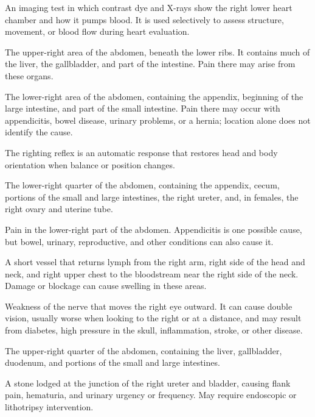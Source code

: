  An imaging test in which contrast dye and X-rays show the right lower heart chamber and how it pumps blood. It is used selectively to assess structure, movement, or blood flow during heart evaluation.

 The upper-right area of the abdomen, beneath the lower ribs. It contains much of the liver, the gallbladder, and part of the intestine. Pain there may arise from these organs.

 The lower-right area of the abdomen, containing the appendix, beginning of the large intestine, and part of the small intestine. Pain there may occur with appendicitis, bowel disease, urinary problems, or a hernia; location alone does not identify the cause.

 The righting reflex is an automatic response that restores head and body orientation when balance or position changes.

 The lower-right quarter of the abdomen, containing the appendix, cecum, portions of the small and large intestines, the right ureter, and, in females, the right ovary and uterine tube.

 Pain in the lower-right part of the abdomen. Appendicitis is one possible cause, but bowel, urinary, reproductive, and other conditions can also cause it.

 A short vessel that returns lymph from the right arm, right side of the head and neck, and right upper chest to the bloodstream near the right side of the neck. Damage or blockage can cause swelling in these areas.

 Weakness of the nerve that moves the right eye outward. It can cause double vision, usually worse when looking to the right or at a distance, and may result from diabetes, high pressure in the skull, inflammation, stroke, or other disease.

 The upper-right quarter of the abdomen, containing the liver, gallbladder, duodenum, and portions of the small and large intestines.

 A stone lodged at the junction of the right ureter and bladder, causing flank pain,
hematuria, and urinary urgency or frequency. May require endoscopic or lithotripsy
intervention.

